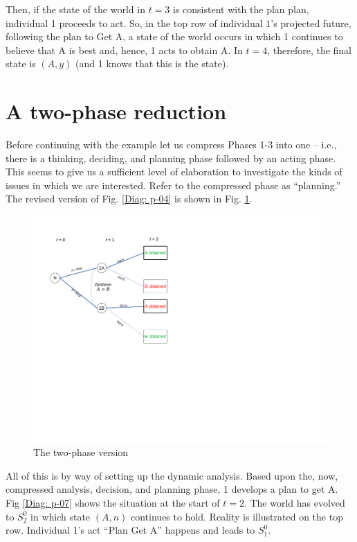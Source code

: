 \documentclass[
11pt,
titlepage,
reqno,
]{article}%
\theoremstyle{definition}
\begin{document}
Then, if the state of the world in $t=3$ is consistent with the plan plan, individual 1 proceeds to act. So, in the top row of individual $1$'s projected future, following the plan to Get A, a state of the world occurs in which 1 continues to believe that A is best and, hence, 1 acts to obtain A. In $t=4$, therefore, the final state is $(A,y)$ (and 1 knows that this is the state).

\section*{A two-phase reduction}
Before continuing with the example let us compress Phases 1-3  into one -- i.e., there is a thinking, deciding, and planning phase followed by an acting phase. This seems to give us a sufficient level of elaboration to investigate the kinds of issues in which we are interested. Refer to the compressed phase as ``planning.'' The revised version of Fig. \ref{Diag: p-04} is shown in Fig. \ref{Diag: p-05}.
 
\begin{figure}[h!]
	\centering
	\includegraphics*[page=5,trim = 0 2in 0in 0in,scale=.65]{Awareness_Diagrams_All}
	\caption{The two-phase version\label{Diag: p-05}}%
\end{figure}

All of this is by way of setting up the dynamic analysis. Based upon the, now, compressed analysis, decision, and planning phase, 1 develops a plan to get A. Fig \ref{Diag: p-07} shows the situation at the start of $t=2$. The world has evolved to $S^0_2$ in which state $(A,n)$ continues to hold. Reality is illustrated on the top row. Individual 1's act ``Plan Get A'' happens and leads to $S^0_1$. 
\end{document}
